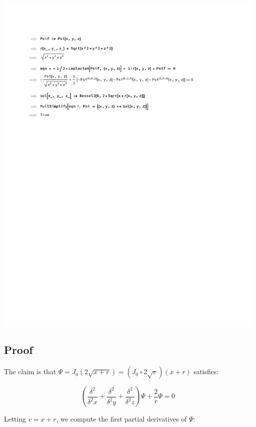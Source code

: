 \documentclass{article}
\begin{document}
\includegraphics[page=1, clip, trim=1in 7in 1in 1in, width=\textwidth]{improved.pdf}

\vfill\eject
\subsection*{Proof}
The claim is that $\Psi = J_0(2\sqrt{x+r}) = (J_0 \circ 2\sqrt{v}) (x+r)$ satisfies:

\begin{equation}
\label{claim}
\left(\frac{\delta^2}{\delta^2 x} + \frac{\delta^2}{\delta^2 y} + \frac{\delta^2}{\delta^2 z}\right) \Psi + \frac{2}{r}\Psi = 0
\end{equation}

Letting $v=x+r$, we compute the first partial derivatives of $\Psi$:

\end{document}
